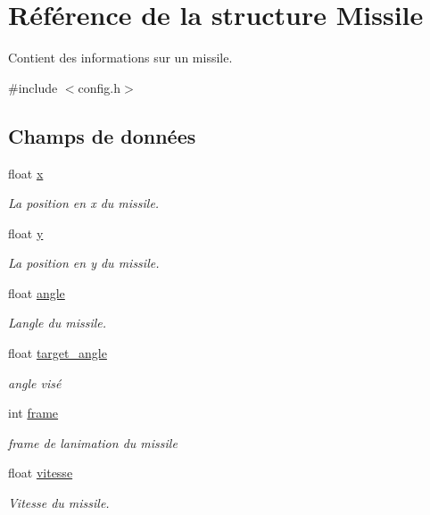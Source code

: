 \hypertarget{struct_missile}{}\section{Référence de la structure Missile}
\label{struct_missile}


Contient des informations sur un missile.  




{\ttfamily \#include $<$config.\+h$>$}

\subsection*{Champs de données}
\begin{DoxyCompactItemize}
\item 
float \hyperlink{struct_missile_a4f6ba98acbd06f78e08098102a73930b}{x}
\begin{DoxyCompactList}\small\item\em La position en x du missile. \end{DoxyCompactList}\item 
float \hyperlink{struct_missile_aada760f7da36c1db96ea885cb8db0b6b}{y}
\begin{DoxyCompactList}\small\item\em La position en y du missile. \end{DoxyCompactList}\item 
float \hyperlink{struct_missile_a1f84bccb1c65efa95e4c30874ad4b655}{angle}
\begin{DoxyCompactList}\small\item\em L\textquotesingle{}angle du missile. \end{DoxyCompactList}\item 
float \hyperlink{struct_missile_a34b0404eadb95704f64dd2c38de1de76}{target\+\_\+angle}
\begin{DoxyCompactList}\small\item\em angle visé \end{DoxyCompactList}\item 
int \hyperlink{struct_missile_a6bdfd2d510a44beeff7a792bb3b54514}{frame}
\begin{DoxyCompactList}\small\item\em frame de l\textquotesingle{}animation du missile \end{DoxyCompactList}\item 
float \hyperlink{struct_missile_ac705f74cb3713ef8ffccc1f489792b43}{vitesse}
\begin{DoxyCompactList}\small\item\em Vitesse du missile. \end{DoxyCompactList}\item 

\end{DoxyCompactItemize}
